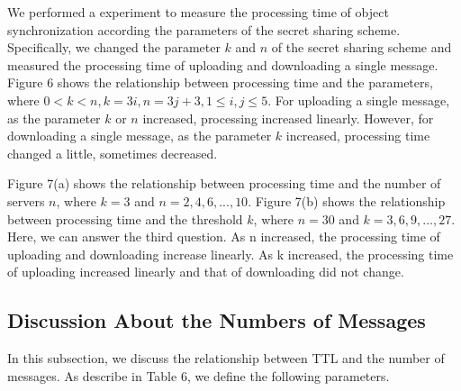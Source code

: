\documentclass[twocolumn,10pt]{article}
\begin{document}
We performed a experiment to measure the processing time of object synchronization according the parameters of the secret sharing scheme.
Specifically, we changed the parameter ${k}$  and ${n}$ of the secret sharing scheme and measured the processing time of uploading and downloading a single message.
Figure 6 shows the relationship between processing time and the parameters, where ${0< k < n, k=3i, n=3j+3, 1 \leq i, j \leq 5}$.
For uploading a single message, as the parameter ${k}$ or ${n}$ increased, processing increased linearly.
However, for downloading a single message, as the parameter ${k}$ increased, processing time  changed a little, sometimes decreased.

Figure 7(a) shows the relationship between processing time and the number of servers ${n}$, where ${k=3}$ and ${n = 2, 4, 6, ... , 10}$. 
Figure 7(b) shows the relationship between processing time and the threshold ${k}$, where ${n=30}$ and ${k = 3, 6, 9, ... , 27}$. 
Here, we can answer the third question.
As n increased, the processing time of uploading and downloading increase linearly. 
As k increased, the processing time of uploading increased linearly and that of downloading did not change. 

\subsection{Discussion About the Numbers of Messages}

In this subsection, we discuss the relationship between TTL and the number of messages. 
As describe in Table 6, we define the following parameters.
\end{document}
